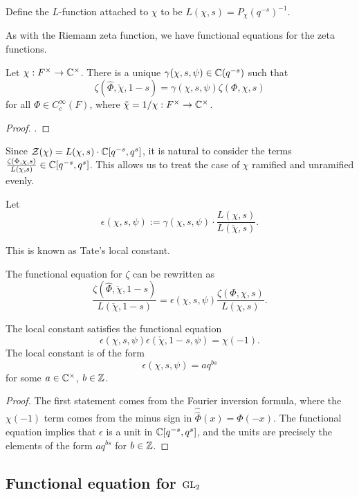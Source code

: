 \begin{defn}
    Define the $L$-function attached to $\chi$ to be $L(\chi,s)=P_\chi(q^{-s})^{-1}$.
\end{defn}

As with the Riemann zeta function, we have functional equations for the zeta functions.

\begin{thm}\label{thm:gl1gamma}
    Let $\chi: F^\times \to \mathbb{C}^\times$. There is a unique $\gamma(\chi,s,\psi) \in \mathbb{C}(q^{-s})$ such that 
    $$\zeta(\hat{\Phi}, \check{\chi},1-s) = \gamma(\chi,s,\psi) \zeta(\Phi,\chi,s)$$ for all $\Phi \in C_c^\infty(F)$, where $\check{\chi}=1/\chi : F^\times \to \mathbb{C}^\times$.
\end{thm}
\begin{proof}
    \cite[Theorem 23.3]{BH1}.
\end{proof}

Since $\mathcal Z(\chi) = L(\chi,s)\cdot \mathbb{C}[q^{-s},q^s]$, it is natural to consider the terms $\frac{\zeta(\Phi,\chi,s)}{L(\chi,s)} \in \mathbb{C}[q^{-s},q^s]$. This allows us to treat the case of $\chi$ ramified and unramified evenly. 

\begin{defn}
    Let $$\epsilon(\chi,s,\psi) := \gamma(\chi,s,\psi) \cdot \frac{L(\chi,s)}{L(\check{\chi},s)}.$$
\end{defn}
This is known as Tate's local constant.

The functional equation for $\zeta$ can be rewritten as
$$\frac{\zeta(\hat{\Phi},\check{\chi},1-s)}{L(\check{\chi},1-s)} = \epsilon(\chi,s,\psi) \frac{\zeta(\Phi,\chi,s)}{L(\chi,s)}.$$

\begin{cor}
    The local constant satisfies the functional equation
    $$\epsilon(\chi,s,\psi)\epsilon(\check{\chi},1-s,\psi) = \chi(-1).$$
    The local constant is of the form $$\epsilon(\chi,s,\psi) = aq^{bs}$$ for some $a \in \mathbb{C}^\times$, $b \in \mathbb{Z}$.
\end{cor}
\begin{proof}
    The first statement comes from the Fourier inversion formula, where the $\chi(-1)$ term comes from the minus sign in $\hat{\hat{\Phi}}(x) = \Phi(-x)$. The functional equation implies that $\epsilon$ is a unit in $\mathbb{C}[q^{-s},q^s]$, and the units are precisely the elements of the form $aq^{bs}$ for $b \in \mathbb{Z}$.
\end{proof}


\subsection{Functional equation for \texorpdfstring{$\mathrm{GL}_2$}{TEXT}}

